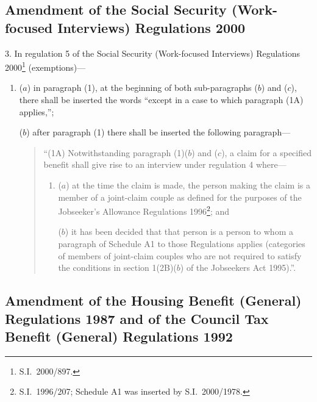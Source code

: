 \documentclass[12pt,a4paper]{article}
\begin{document}
\subsection[3. Amendment of the Social Security (Work-focused Interviews) Regulations 2000]{\sloppy Amendment of the Social Security (Work-focused Interviews) Regulations 2000}

3.  In regulation 5 of the Social Security (Work-focused Interviews) Regulations 2000\footnote{S.I.\ 2000/897.} (exemptions)—
\begin{enumerate}\item[]
($a$) in paragraph (1), at the beginning of both sub-paragraphs ($b$)  and ($c$), there shall be inserted the words “except in a case to which paragraph (1A) applies,”;

($b$) after paragraph (1) there shall be inserted the following paragraph—
\begin{quotation}
“(1A) Notwithstanding paragraph (1)($b$)  and ($c$), a claim for a specified benefit shall give rise to an interview under regulation 4 where—
\begin{enumerate}\item[]
($a$) at the time the claim is made, the person making the claim is a member of a joint-claim couple as defined for the purposes of the Jobseeker’s Allowance Regulations 1996\footnote{S.I.\ 1996/207; Schedule A1 was inserted by S.I.\ 2000/1978.}; and

($b$) it has been decided that that person is a person to whom a paragraph of Schedule A1 to those Regulations applies (categories of members of joint-claim couples who are not required to satisfy the conditions in section 1(2B)($b$)  of the Jobseekers Act 1995).”.
\end{enumerate}
\end{quotation}
\end{enumerate}

\subsection[4. Amendment of the Housing Benefit (General) Regulations 1987 and of the Council Tax Benefit (General) Regulations 1992]{Amendment of the Housing Benefit (General) Regulations 1987 and of the Council Tax Benefit (General) Regulations 1992}
\end{document}
